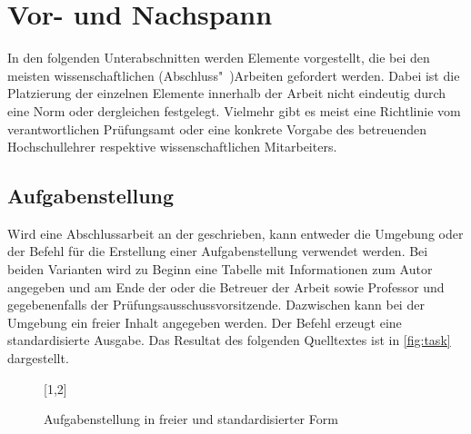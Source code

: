\documentclass[english,ngerman]{tudscrartcl}
\begin{document}
\section{Vor- und Nachspann}
In den folgenden Unterabschnitten werden Elemente vorgestellt, die bei den 
meisten wissenschaftlichen (Abschluss"~)Arbeiten gefordert werden. Dabei ist 
die Platzierung der einzelnen Elemente innerhalb der Arbeit nicht eindeutig 
durch eine Norm oder dergleichen festgelegt. Vielmehr gibt es meist eine 
Richtlinie vom verantwortlichen Prüfungsamt oder eine konkrete Vorgabe des 
betreuenden Hochschullehrer respektive wissenschaftlichen Mitarbeiters. 


\subsection{Aufgabenstellung}
Wird eine Abschlussarbeit an der \TnUD geschrieben, kann entweder die Umgebung 
 oder der Befehl  für die Erstellung einer 
Aufgabenstellung verwendet werden. Bei beiden Varianten wird zu Beginn eine 
Tabelle mit Informationen zum Autor angegeben und am Ende der oder die Betreuer 
der Arbeit sowie Professor und gegebenenfalls der Prüfungsausschussvorsitzende. 
Dazwischen kann bei der Umgebung  ein freier Inhalt angegeben 
werden. Der Befehl  erzeugt eine standardisierte Ausgabe. Das 
Resultat des folgenden Quelltextes ist in \autoref{fig:task} dargestellt.
\begin{figure}
[1,2]
\caption{Aufgabenstellung in freier und standardisierter Form}
\label{fig:task}
\end{figure}
\end{document}

